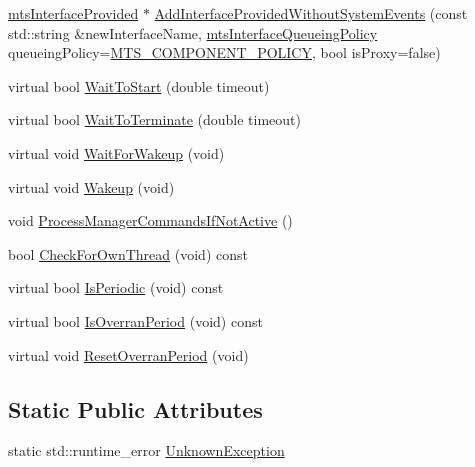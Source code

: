 \begin{DoxyCompactItemize}
\item 
\hyperlink{classmts_interface_provided}{mts\+Interface\+Provided} $\ast$ \hyperlink{classmts_task_a285ac2354e954ed0f3f8213590eff19c}{Add\+Interface\+Provided\+Without\+System\+Events} (const std\+::string \&new\+Interface\+Name, \hyperlink{mts_forward_declarations_8h_abedfb5c45b329a89b0fb647a96a7c938}{mts\+Interface\+Queueing\+Policy} queueing\+Policy=\hyperlink{mts_forward_declarations_8h_abedfb5c45b329a89b0fb647a96a7c938aff70a768b1fb65f10206583efbad12bb}{M\+T\+S\+\_\+\+C\+O\+M\+P\+O\+N\+E\+N\+T\+\_\+\+P\+O\+L\+I\+C\+Y}, bool is\+Proxy=false)
\item 
virtual bool \hyperlink{classmts_task_aeb6270faa5d0c00740677c510e7031a4}{Wait\+To\+Start} (double timeout)
\item 
virtual bool \hyperlink{classmts_task_ad0b31e1f08f2ce351eb5f71e80ccda27}{Wait\+To\+Terminate} (double timeout)
\item 
virtual void \hyperlink{classmts_task_ab99ef3c0d368d3f2a35c5fad7a035471}{Wait\+For\+Wakeup} (void)
\item 
virtual void \hyperlink{classmts_task_a4cb52c04023a0cc729a92eceefa268f7}{Wakeup} (void)
\item 
void \hyperlink{classmts_task_aa8f23b499eb009b20055b54df343fb37}{Process\+Manager\+Commands\+If\+Not\+Active} ()
\item 
bool \hyperlink{classmts_task_a6cd434e821df3f460832856c8d15bf2f}{Check\+For\+Own\+Thread} (void) const 
\item 
virtual bool \hyperlink{classmts_task_ae6568e446bb341b862bb2748be221c85}{Is\+Periodic} (void) const 
\item 
virtual bool \hyperlink{classmts_task_a09580b446a82b6ecdd14f6e5d2b5da96}{Is\+Overran\+Period} (void) const 
\item 
virtual void \hyperlink{classmts_task_a317c88555ccdb5a70af2cba2d9070c8d}{Reset\+Overran\+Period} (void)
\end{DoxyCompactItemize}
\subsection*{Static Public Attributes}
\begin{DoxyCompactItemize}
\item 
static std\+::runtime\+\_\+error \hyperlink{classmts_task_a518652604363d9402292a67c1836e888}{Unknown\+Exception}
\end{DoxyCompactItemize}
